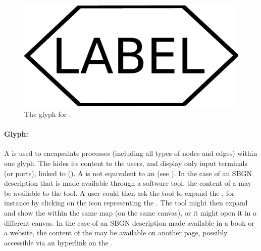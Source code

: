 \begin{figure}[H]
  \centering
  \includegraphics[scale = 0.3]{images/phenotype}
  \caption{The \PD glyph for .}
  \label{fig:phenotype}
\end{figure}



\paragraph{Glyph: }
\label{sec:submap}

A  is used to encapsulate processes (including all types of nodes and edges) within one glyph.  The  hides its content to the users, and display only input terminals (or ports), linked to  (). A  is not equivalent to an  (see ).  In the case of an SBGN description that is made available through a software tool, the content of a  may be available to the tool.  A user could then ask the tool to expand the , for instance by clicking on the icon representing the .  The tool might then expand and show the  within the same map (on the same canvas), or it might open it in a different canvas. In the case of an SBGN description made available in a book or a website, the content of the  may be available on another page, possibly accessible via an hyperlink on the .

